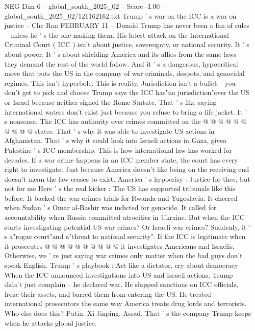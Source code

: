 \begin{textsample}{NEG Dim 6 – global\_south\_2025\_02 – Score -1.00 – global\_south\_2025\_02/121162162.txt}  \label{ex:f6_neg_049}
Trump ' s war on the ICC is a war on justice -- Che Ran FEBRUARY 11 -- Donald Trump has never been a fan of rules -- unless he ' s the one making them.
His latest attack on the International Criminal Court ( ICC ) isn't about justice, sovereignty, or national security.
It ' s about power.
It ' s about shielding America and its allies from the same laws they demand the rest of the world follow.
And it ' s a dangerous, hypocritical move that puts the US in the company of war criminals, despots, and genocidal regimes.
This isn't hyperbole.
This is reality.
Jurisdiction isn't a buffet -- you don't get to pick and choose Trump says the ICC has"no jurisdiction"over the US or Israel because neither signed the Rome Statute.
That ' s like saying international waters don't exist just because you refuse to bring a life jacket.
It ' s nonsense.
The ICC has authority over crimes committed on the @ @ @ @ @ @ @ @ @ @ states.
That ' s why it was able to investigate US actions in Afghanistan.
That ' s why it could look into Israeli actions in Gaza, given Palestine ' s ICC membership.
This is how international law has worked for decades.
If a war crime happens in an ICC member state, the court has every right to investigate.
Just because America doesn't like being on the receiving end doesn't mean the law ceases to exist.
America ' s hypocrisy : Justice for thee, but not for me Here ' s the real kicker : The US has supported tribunals like this before.
It backed the war crimes trials for Rwanda and Yugoslavia.
It cheered when Sudan ' s Omar al-Bashir was indicted for genocide.
It called for accountability when Russia committed atrocities in Ukraine.
But when the ICC starts investigating potential US war crimes?
Or Israeli war crimes?
Suddenly, it ' s a"rogue court"and a"threat to national security".
If the ICC is legitimate when it prosecutes @ @ @ @ @ @ @ @ @ @ it investigates Americans and Israelis.
Otherwise, we ' re just saying war crimes only matter when the bad guys don't speak English.
Trump ' s playbook : Act like a dictator, cry about democracy When the ICC announced investigations into US and Israeli actions, Trump didn't just complain -- he declared war.
He slapped sanctions on ICC officials, froze their assets, and barred them from entering the US.
He treated international prosecutors the same way America treats drug lords and terrorists.
Who else does this?
Putin.
Xi Jinping.
Assad.
That ' s the company Trump keeps when he attacks global justice.

\end{textsample}
